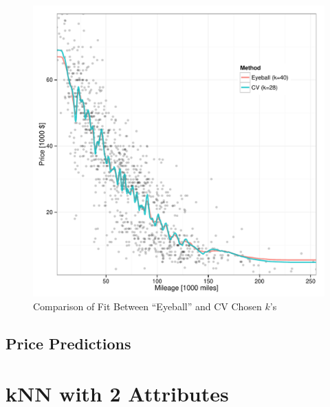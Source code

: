 \documentclass[11pt, fleqn]{article}
\begin{document}
\begin{figure}[!htb]
  \centering
  \includegraphics[scale=.5]{1p_fit_eye_ev.pdf}
  \caption{Comparison of Fit Between ``Eyeball'' and CV Chosen $k$'s}
  \label{fig:1p_fit}
\end{figure}

\subsection{Price Predictions}


\section{kNN with 2 Attributes}
\end{document}
